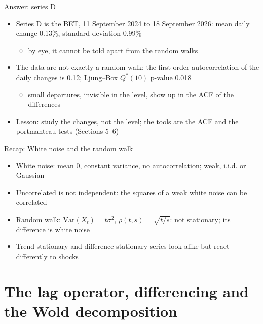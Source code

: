 \begin{frame}{Answer: series D}
\itemsize{\small}
\begin{itemize}
    \item Series D is the BET, 11 September 2024 to 18 September 2026: mean daily change 0.13\%, standard deviation 0.99\%
    \begin{itemize}
        \item by eye, it cannot be told apart from the random walks
    \end{itemize}
    \item The data are not exactly a random walk: the first-order autocorrelation of the daily changes is 0.12; Ljung--Box $Q^*(10)$ p-value 0.018
    \begin{itemize}
        \item small departures, invisible in the level, show up in the ACF of the differences
    \end{itemize}
    \item Lesson: study the changes, not the level; the tools are the ACF and the portmanteau tests (Sections 5--6)
\end{itemize}
\end{frame}

\begin{frame}{Recap: White noise and the random walk}
\itemsize{\small}
\begin{itemize}
    \item White noise: mean 0, constant variance, no autocorrelation; weak, i.i.d. or Gaussian
    \item Uncorrelated is not independent: the squares of a weak white noise can be correlated
    \item Random walk: $\mathrm{Var}(X_t) = t\sigma^2$, $\rho(t, s) = \sqrt{t/s}$: not stationary; its difference is white noise
    \item Trend-stationary and difference-stationary series look alike but react differently to shocks
\end{itemize}
\end{frame}


\section{The lag operator, differencing and the Wold decomposition}

